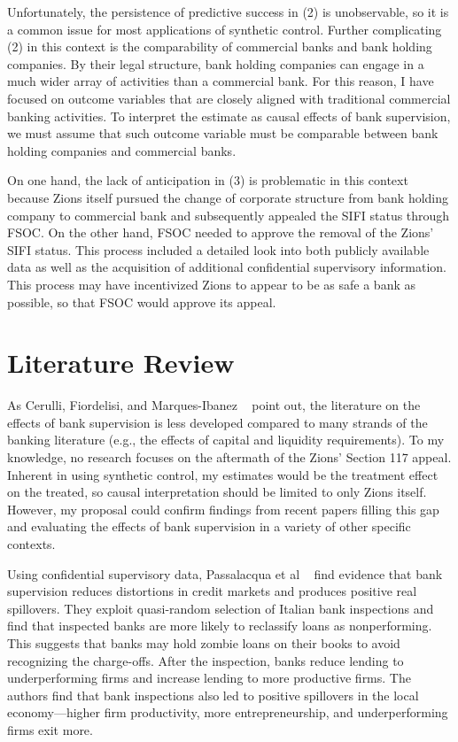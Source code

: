 \documentclass[12pt]{article}
\begin{document}
Unfortunately, the persistence of predictive success in (2) is unobservable, so it is a common issue for most applications of synthetic control. Further complicating (2) in this context is the comparability of commercial banks and bank holding companies.  By their legal structure, bank holding companies can engage in a much wider array of activities than a commercial bank.  For this reason, I have focused on outcome variables that are closely aligned with traditional commercial banking activities. To interpret the estimate as causal effects of bank supervision, we must assume that such outcome variable must be comparable between bank holding companies and commercial banks.

On one hand, the lack of anticipation in (3) is problematic in this context because Zions itself pursued the change of corporate structure from bank holding company to commercial bank and subsequently appealed the SIFI status through FSOC.  On the other hand, FSOC needed to approve the removal of the Zions' SIFI status. This process included a detailed look into both publicly available data as well as the acquisition of additional confidential supervisory information. This process may have incentivized Zions to appear to be as safe a bank as possible, so that FSOC would approve its appeal. 

\pagebreak

\section{Literature Review}

As Cerulli, Fiordelisi, and Marques-Ibanez ~\cite{cerulli2021} point out, the literature on the effects of bank supervision is less developed compared to many strands of the banking literature (e.g., the effects of capital and liquidity requirements). To my knowledge, no research focuses on the aftermath of the Zions' Section 117 appeal. Inherent in using synthetic control, my estimates would be the treatment effect on the treated, so causal interpretation should be limited to only Zions itself.  However, my proposal could confirm findings from recent papers filling this gap and evaluating the effects of bank supervision in a variety of other specific contexts.

Using confidential supervisory data, Passalacqua et al ~\cite{passalacqua2020} find evidence that bank supervision reduces distortions in credit markets and produces positive real spillovers.  They exploit quasi-random selection of Italian bank inspections and find that inspected banks are more likely to reclassify loans as nonperforming.  This suggests that banks may hold zombie loans on their books to avoid recognizing the charge-offs.  After the inspection, banks reduce lending to underperforming firms and increase lending to more productive firms.  The authors find that bank inspections also led to positive spillovers in the local economy---higher firm productivity, more entrepreneurship, and underperforming firms exit more.
\end{document}
